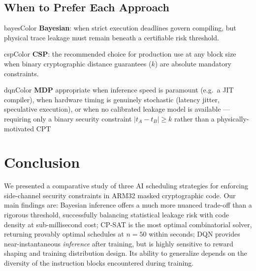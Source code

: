 \documentclass[letterpaper]{article}
\begin{document}
\subsection{When to Prefer Each Approach}

\begin{preferbox}{bayesColor}
  \textbf{\textcolor{bayesColor}{Bayesian}}: when strict execution deadlines govern compiling, but physical trace leakage must remain beneath a certifiable risk threshold.
\end{preferbox}
\begin{preferbox}{cspColor}
  \textbf{\textcolor{cspColor}{CSP}}: the recommended choice for production use at any block size when binary cryptographic distance guarantees ($k$) are absolute mandatory constraints.
\end{preferbox}
\begin{preferbox}{dqnColor}
  \textbf{\textcolor{dqnColor}{MDP}} appropriate when inference speed is paramount
  (e.g.\ a JIT compiler), when hardware timing is genuinely
  stochastic (latency jitter, speculative execution), or when
  no calibrated leakage model is available --- requiring only
  a binary security constraint $|t_A - t_B| \geq k$ rather
  than a physically-motivated CPT
\end{preferbox}



\section{Conclusion}
\label{sec:conclusion}

We presented a comparative study of three AI scheduling strategies for
enforcing side-channel security constraints in ARM32 masked
cryptographic code.  Our main findings are: \newline
\textcolor{bayesColor}{Bayesian inference} offers a much more nuanced
trade-off than a rigorous threshold, successfully balancing statistical
leakage risk with code density at sub-millisecond cost; \newline
\textcolor{cspColor}{CP-SAT} is the most optimal combinatorial solver, returning provably optimal schedules at
$n=50$ within seconds; \newline
\textcolor{dqnColor}{DQN} provides near-instantaneous \emph{inference} after training, but is highly sensitive to reward shaping and training distribution design. Its ability to generalize depends on the diversity of the instruction blocks encountered during training.
\end{document}
